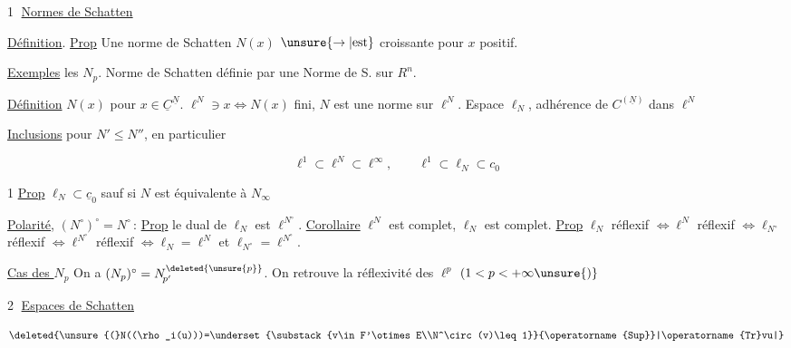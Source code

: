 

\textcircled{1} \uline{Normes de Schatten}

\uline{Définition}. \uline{Prop} Une norme de Schatten $N(x)$ $\unsure{\to|\text{est}}$ croissante pour $x$ positif. 

\uline{Exemples} les $N_p$. Norme de Schatten définie par une Norme de S. sur $R^n$.

\uline{Définition} $N(x)$ pour $x\in\underline C^{\underline N}$. $\ell^N\ni x\Longleftrightarrow N(x)$ fini, $N$ est une norme sur $\ell^N$. Espace $\ell_N$, adhérence de $C^{(\underline N)}$ dans $\ell^N$

\uline{Inclusions} pour $N'\leq N''$, en particulier

\[
\ell^1\subset\ell^N\subset\ell^\infty,\qquad \ell^1\subset\ell_N\subset c_0
\]

1 \uline{Prop} $\ell_N\subset\underline c_0$ sauf si $N$ est équivalente à $N_\infty$

\uline{Polarité}, $(N^\circ)^\circ=N^\circ$\,: \uline{Prop} le dual de $\ell_N$ est $\ell^{N^\circ}$. \uline{Corollaire} $\ell^N$ est complet, $\ell_N$ est complet. \uline{Prop} $\ell_N$ réflexif $\Longleftrightarrow\ell^N$ réflexif $\Longleftrightarrow\ell_{N^\circ}$ réflexif $\Longleftrightarrow\ell^{N^\circ}$ réflexif $\Longleftrightarrow\ell_N=\ell^N$ et $\ell_{N^\circ}=\ell^{N^\circ}$.

 \uline{Cas des $N_p$} On a $(N_p)^\circ=N_{\!p'}^{\deleted{\unsure{p}}}$. On retrouve la réflexivité des $\ell^p$ $(1<p<+\infty\unsure{)}$

\textcircled{2} \uline{Espaces de Schatten}



\[
\deleted{\unsure{(}N((\rho_i(u)))=\underset{\substack{v\in F'\otimes E\\N^\circ(v)\leq 1}}{\operatorname{Sup}}|\operatorname{Tr}vu|}
\]

